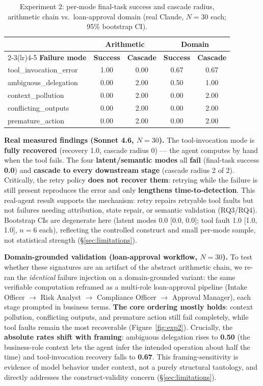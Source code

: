 \documentclass[sigconf,nonacm,anonymous]{acmart}  %
\begin{document}
\begin{table}[t]
\centering
\caption{Experiment 2: per-mode final-task success and cascade radius, arithmetic
chain vs.\ loan-approval domain (real Claude, $N{=}30$ each; 95\% bootstrap CI).}
\label{tab:exp2}
\small
\begin{tabular}{@{}lcccc@{}}
\toprule
& \multicolumn{2}{c}{\textbf{Arithmetic}} & \multicolumn{2}{c}{\textbf{Domain}} \\
\cmidrule(lr){2-3}\cmidrule(lr){4-5}
\textbf{Failure mode} & \textbf{Success} & \textbf{Cascade} & \textbf{Success} &
\textbf{Cascade} \\
\midrule
tool\_invocation\_error & 1.00 & 0.00 & 0.67 & 0.67 \\
ambiguous\_delegation & 0.00 & 2.00 & 0.50 & 1.00 \\
context\_pollution & 0.00 & 2.00 & 0.00 & 2.00 \\
conflicting\_outputs & 0.00 & 2.00 & 0.00 & 2.00 \\
premature\_action & 0.00 & 2.00 & 0.00 & 2.00 \\
\bottomrule
\end{tabular}
\end{table}

\textbf{Real measured findings (Sonnet 4.6, $N{=}30$).}
The tool-invocation mode is \textbf{fully recovered} (recovery 1.0, cascade
radius 0) --- the agent computes by hand when the tool fails. The four
\textbf{latent/semantic modes} all \textbf{fail} (final-task success
\textbf{0.0}) and \textbf{cascade to every downstream stage} (cascade radius 2 of
2). Critically, the retry policy \textbf{does not recover them}: retrying
while the failure is still present reproduces the error and only
\textbf{lengthens time-to-detection}. This real-agent result supports the
mechanism: retry repairs retryable tool faults but not failures needing
attribution, state repair, or semantic validation (RQ3/RQ4). Bootstrap CIs are
degenerate here (latent modes 0.0 [0.0, 0.0]; tool fault 1.0 [1.0, 1.0], $n{=}6$
each), reflecting the controlled construct and small per-mode sample, not
statistical strength
(\S\ref{sec:limitations}).

\textbf{Domain-grounded validation (loan-approval workflow, $N{=}30$).} To test
whether these signatures are an artifact of the abstract arithmetic chain, we
re-ran the \emph{identical} failure injection on a domain-grounded variant: the
same verifiable computation reframed as a multi-role loan-approval pipeline
(Intake Officer $\to$ Risk Analyst $\to$ Compliance Officer $\to$ Approval
Manager), each stage prompted in business terms. \textbf{The core ordering
mostly holds}: context pollution, conflicting outputs, and premature action
still fail completely, while tool faults remain the most recoverable
(Figure~\ref{fig:exp2}). Crucially, the \textbf{absolute rates shift with
framing}: ambiguous delegation rises to \textbf{0.50} (the business-role
context lets the agent infer the intended operation about half the time) and
tool-invocation recovery falls to \textbf{0.67}. This
framing-sensitivity is evidence of model behavior under context, not a purely
structural tautology, and directly addresses the construct-validity concern
(\S\ref{sec:limitations}).
\end{document}

